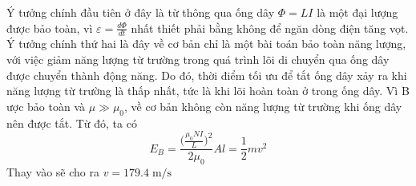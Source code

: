 \begin{solution}
Ý tưởng chính đầu tiên ở đây là từ thông qua ống dây \( \Phi = LI \) là một đại lượng được bảo toàn, vì \( \varepsilon = \frac{d \Phi}{dt} \) nhất thiết phải bằng không để ngăn dòng điện tăng vọt. Ý tưởng chính thứ hai là đây về cơ bản chỉ là một bài toán bảo toàn năng lượng, với việc giảm năng lượng từ trường trong quá trình lõi di chuyển qua ống dây được chuyển thành động năng. Do đó, thời điểm tối ưu để tắt ống dây xảy ra khi năng lượng từ trường là thấp nhất, tức là khi lõi hoàn toàn ở trong ống dây.
\newline
\newline
Vì B ược bảo toàn và  $\mu \gg \mu_0$, về cơ bản không còn năng lượng từ trường khi ống dây nên được tắt.
Từ đó, ta có
$$E_B = \frac{\bigg (\frac{\mu_0 N I}{L}\bigg )^2}{2 \mu_0}Al = {\frac{1}{2}}mv^2$$
Thay vào sẽ cho ra $\boxed{v = 179.4 \;\mathrm{m/s}}$
\end{solution}